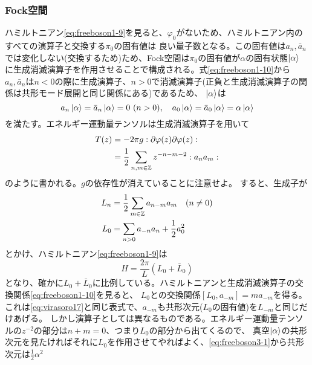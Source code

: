 \documentclass[11pt, aps, longbibliography]{article}
\numberwithin{equation}{section}
\begin{document}
        \subsubsection{Fock空間}
        ハミルトニアン\eqref{eq:freeboson1-9}を見ると、$\varphi_0$がないため、ハミルトニアン内のすべての演算子と交換する$\pi_0$の固有値は
        良い量子数となる。この固有値は$a_n,\bar{a}_n$では変化しない(交換するため)ため、Fock空間は$\pi_0$の固有値が$\alpha$の固有状態$\ket{\alpha}$
        に生成消滅演算子を作用させることで構成される。式\eqref{eq:freeboson1-10}から$a_n,\bar{a}_n$は$n<0$の際に生成演算子、$n>0$で消滅演算子(正負と生成消滅演算子の関係は共形モード展開と同じ関係にある)であるため、
        $\ket{\alpha}$は
        \begin{equation}\label{eq:freeboson3-1}
            a_n\ket{\alpha} = \bar{a}_n \ket{\alpha} = 0 \ (n>0), \quad a_0\ket{\alpha} = \bar{a}_0\ket{\alpha} = \alpha \ket{\alpha}
        \end{equation}
        を満たす。エネルギー運動量テンソルは生成消滅演算子を用いて
        \begin{align}\label{eq:freeboson3-2}
            T(z) &= -2\pi g:\partial \varphi(z)\partial \varphi(z): \notag \\
            &= \frac{1}{2} \sum_{n,m\in\mathbb{Z}} z^{-n-m-2} :a_na_m:
        \end{align}
        のように書かれる。$g$の依存性が消えていることに注意せよ。
        すると、生成子が
        \begin{align}\label{eq:freeboson3-3}
            L_n &= \frac{1}{2}\sum_{m\in\mathbb{Z}}a_{n-m}a_m \quad (n\neq 0) \\
            L_0 &= \sum_{n>0}a_{-n}a_n + \frac{1}{2}a_0^2 \notag
        \end{align}
        とかけ、ハミルトニアン\eqref{eq:freeboson1-9}は
        \begin{equation}\label{eq:freeboson3-4}
            H = \frac{2\pi}{L}(L_0 + \bar{L}_0)
        \end{equation}
        となり、確かに$L_0 + \bar{L}_0$に比例している。ハミルトニアンと生成消滅演算子の交換関係\eqref{eq:freeboson1-10}を見ると、
        $L_0$との交換関係$[L_0, a_{-m}]=ma_{-m}$を得る。これは\eqref{eq:virasoro17}と同じ表式で、$a_{-m}$も共形次元($L_0$の固有値)を$L_{-m}$と同じだけあげる。
        しかし演算子としては異なるものである。エネルギー運動量テンソルの$z^{-2}$の部分は$n+m=0$、つまり$L_0$の部分から出てくるので、
        真空$\ket{\alpha}$の共形次元を見たければそれに$L_0$を作用させてやればよく、\eqref{eq:freeboson3-1}から共形次元は$\frac{1}{2}\alpha^2$
\end{document}
